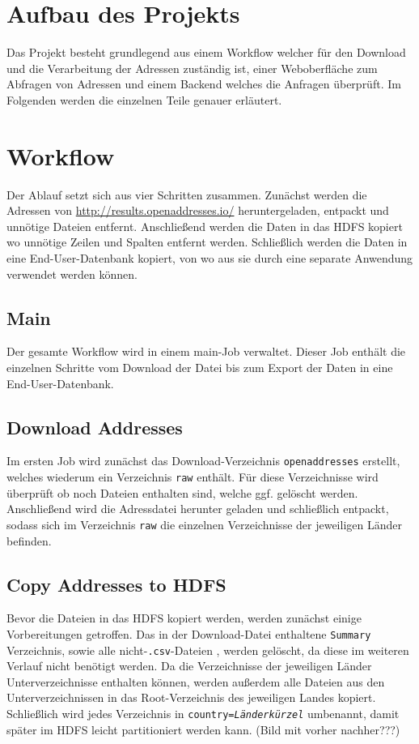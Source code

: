 \documentclass[
	a4paper,
	12p,
	bibliography=totocnumbered
]{scrartcl}
\begin{document}
\section{Aufbau des Projekts}

Das Projekt besteht grundlegend aus einem Workflow welcher für den Download und die Verarbeitung der Adressen zuständig ist, einer Weboberfläche zum Abfragen von Adressen und einem Backend welches die Anfragen überprüft. Im Folgenden werden die einzelnen Teile genauer erläutert.

\section{Workflow}


Der Ablauf setzt sich aus vier Schritten zusammen. Zunächst werden die Adressen von \url{http://results.openaddresses.io/} heruntergeladen, entpackt und unnötige Dateien entfernt. Anschließend werden die Daten in das HDFS kopiert wo unnötige Zeilen und Spalten entfernt werden. Schließlich werden die Daten in eine End-User-Datenbank kopiert, von wo aus sie durch eine separate Anwendung verwendet werden können.

\subsection{Main}

Der gesamte Workflow wird in einem main-Job verwaltet. Dieser Job enthält die einzelnen Schritte vom Download der Datei bis zum Export der Daten in eine End-User-Datenbank.

\subsection{Download Addresses}

Im ersten Job wird zunächst das Download-Verzeichnis \texttt{openaddresses} erstellt, welches wiederum ein Verzeichnis \texttt{raw} enthält. Für diese Verzeichnisse wird überprüft ob noch Dateien enthalten sind, welche ggf. gelöscht werden. Anschließend wird die Adressdatei herunter geladen und schließlich entpackt, sodass sich im Verzeichnis \texttt{raw} die einzelnen Verzeichnisse der jeweiligen Länder befinden.


\subsection{Copy Addresses to HDFS}

Bevor die Dateien in das HDFS kopiert werden, werden zunächst einige Vorbereitungen getroffen. Das in der Download-Datei enthaltene \texttt{Summary} Verzeichnis, sowie alle \glqq nicht-\texttt{.csv}-Dateien \grqq{}, werden gelöscht, da diese im weiteren Verlauf nicht benötigt werden. Da die Verzeichnisse der jeweiligen Länder Unterverzeichnisse enthalten können, werden außerdem alle Dateien aus den Unterverzeichnissen in das Root-Verzeichnis des jeweiligen Landes kopiert. Schließlich wird jedes Verzeichnis in \texttt{country=\textit{Länderkürzel}} umbenannt, damit später im HDFS leicht partitioniert werden kann. (Bild mit vorher nachher???)\\
\end{document}
